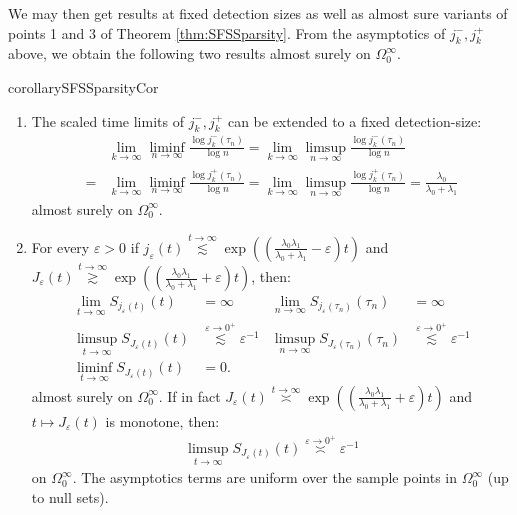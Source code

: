 \documentclass{article}
\numberwithin{equation}{section}
\newcommand{\ordas}[2]{\overset{{#1}\to {#2}}{\asymp}}
\begin{document}
We may then get results at fixed detection sizes as well as almost sure variants of points 1 and 3 of Theorem \ref{thm:SFSSparsity}.
From the asymptotics of $j_k^-,j_k^+$ above, we obtain the following two results almost surely on $\Omega_0^\infty$.
\begin{restatable}{corollary}{SFSSparsityCor}\label{cor:SFSSparsity}
 \begin{enumerate}
        \item The scaled time limits of $j_k^-,j_k^+$ can be extended to a fixed detection-size:
        \begin{align*}
        &\lim_{k\to\infty}\liminf_{n\to\infty}\frac{\log j_k^-(\tau_n)}{\log n}=\lim_{k\to\infty}\limsup_{n\to\infty}\frac{\log j_k^-(\tau_n)}{\log n}\\
        =&\lim_{k\to\infty}\liminf_{n\to\infty}\frac{\log j_k^+(\tau_n)}{\log n}=\lim_{k\to\infty}\limsup_{n\to\infty}\frac{\log j_k^+(\tau_n)}{\log n}=\frac{\lambda_0}{\lambda_0+\lambda_1}
    \end{align*}
    almost surely on $\Omega_0^\infty$.
    \item For every $\varepsilon>0$ if $j_{\varepsilon}(t)\overset{t\to\infty}{\lesssim} \exp\left(\left(\frac{\lambda_0\lambda_1}{\lambda_0+\lambda_1}-\varepsilon\right)t\right)$ and $J_{\varepsilon}(t)\overset{t\to\infty}{\gtrsim} \exp\left(\left(\frac{\lambda_0\lambda_1}{\lambda_0+\lambda_1}+\varepsilon\right)t\right)$, then:
    \begin{align*}
        \lim_{t\to\infty}S_{j_\varepsilon(t)}(t)&=\infty & \lim_{n\to\infty} S_{j_\varepsilon(\tau_n)}(\tau_n)&=\infty\\
        \limsup_{t\to\infty} S_{J_\varepsilon(t)}(t)&\overset{\varepsilon\to 0^+}{\lesssim}\varepsilon^{-1} & \limsup_{n\to\infty}S_{J_\varepsilon(\tau_n)}(\tau_n)&\overset{\varepsilon\to 0^+}{\lesssim}\varepsilon^{-1}\\
        \liminf_{t\to\infty}S_{J_\varepsilon(t)}(t)&=0.
    \end{align*}
    almost surely on $\Omega_0^\infty$. If in fact $J_\varepsilon(t)\ordas{t}{\infty}\exp\left(\left(\frac{\lambda_0\lambda_1}{\lambda_0+\lambda_1}+\varepsilon\right)t\right)$ and $t\mapsto J_\varepsilon(t)$ is monotone, then:
    \begin{align*}
        \limsup_{t\to\infty} S_{J_\varepsilon(t)}(t)\ordas{\varepsilon}{0^+}\varepsilon^{-1}
    \end{align*}
    on $\Omega_0^\infty$. The asymptotics terms are uniform over the sample points in $\Omega_0^\infty$ (up to null sets).
    \end{enumerate}
\end{restatable}
\end{document}
